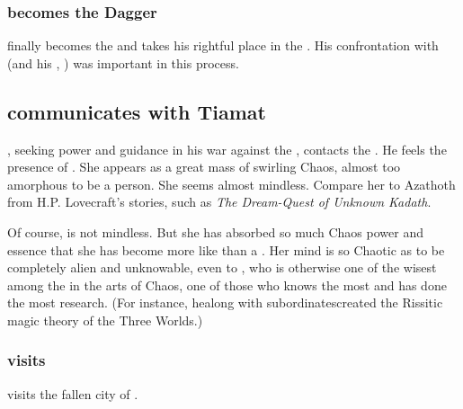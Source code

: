 \begin{garbage}
\subsubsection{\Vizsherioch{} becomes the Dagger}
%
\Vizsherioch{} finally becomes the  and takes his rightful place in the \matrix. 
His confrontation with \Ishnaruchaefir{} (and his , \Rystessakhin) was important in this process. 











\subsection{\Secherdamon{} communicates with Tiamat}
\Secherdamon, seeking power and guidance in his war against the \banes, contacts the \firstgendragons. He feels the presence of \Tiamat. She appears as a great mass of swirling Chaos, almost too amorphous to be a person. She seems almost mindless. Compare her to Azathoth from H.P. Lovecraft's stories, such as \emph{The Dream-Quest of Unknown Kadath}.

Of course, \Tiamat{} is not mindless. But she has absorbed so much Chaos power and \xzaishannic{} essence that she has become more like \xzaishann{} than a \dragon. Her mind is so Chaotic as to be completely alien and unknowable, even to \Secherdamon, who is otherwise one of the wisest among the \shaeeroths{} in the arts of Chaos, one of those who knows the most and has done the most research. (For instance, he\dash along with subordinates\dash created the Rissitic magic theory of the Three Worlds.)





\subsubsection{\Secherdamon{} visits \Dathka}
\Secherdamon{} visits the fallen city of \hs{\Dathka}. 

\end{garbage}
